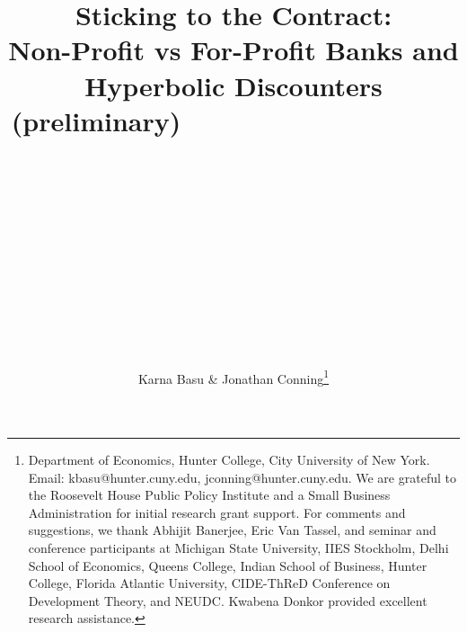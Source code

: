 \documentclass[11pt]{article}%
\begin{document}
\title{Sticking to the Contract: \\Non-Profit vs For-Profit Banks and Hyperbolic Discounters\\(preliminary)\ \ \ \ \ \ \ \ \ \ \ \ \ \ \ \ \ \ \ \ \ \ \ \ \ \ \ \ \ \ \ \ \ \ \ \ \ \ \ \ \ \ \ \ \ \ \ \ \ \ \ \ \ \ \ \ \ \ \ \ \ \ \ \ \ \ \ \ \ \ \ \ \ \ \ \ \ \ \ \ \ \ \ \ \ \ \ \ \ \ \ \ \ \ \ \ \ \ \ \ \ \ \ \ \ \ \ \ \ \ \ \ \ \ \ \ \ \ \ \ \ \ \ \ \ \ \ \ \ \ \ \ \ \ \ \ \ \ \ \ \ \ \ \ \ \ \ \ \ \ \ \ \ \ \ \ \ \ \ \ \ \ \ \ \ \ \ \ \ \ \ \ \ \ \ \ \ }
\author{Karna Basu \& Jonathan Conning\thanks{Department of Economics, Hunter College,
City University of New York. Email: kbasu@hunter.cuny.edu,
jconning@hunter.cuny.edu. We are grateful to the Roosevelt House Public Policy
Institute and a Small Business Administration for initial research grant support. For
comments and suggestions, we thank Abhijit Banerjee, Eric Van Tassel, and
seminar and conference participants at Michigan State University, IIES
Stockholm, Delhi School of Economics, Queens College, Indian School of
Business, Hunter College, Florida Atlantic University, CIDE-ThReD Conference
on Development Theory, and NEUDC. Kwabena Donkor provided excellent research
assistance.}}
\maketitle
\end{document}

